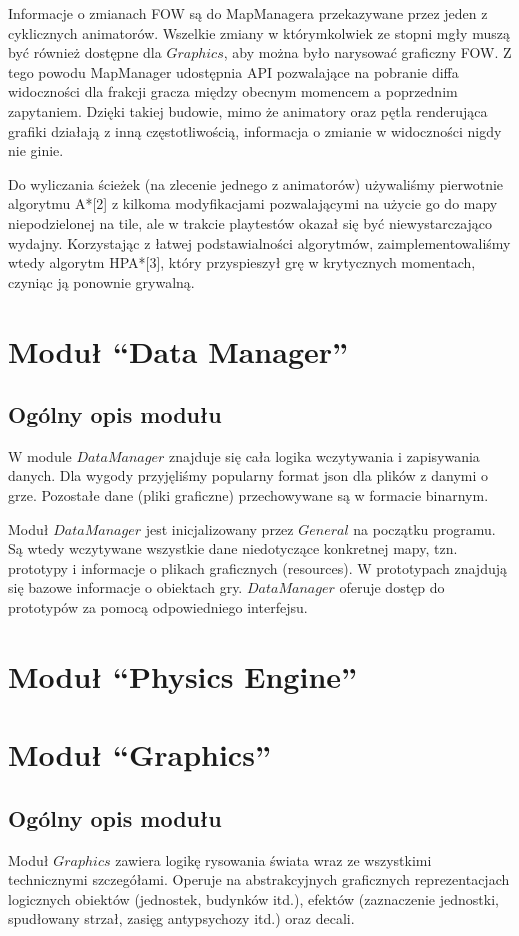 \documentclass[licencjacka]{pracamgr}
\begin{document}
    Informacje o zmianach FOW są do MapManagera przekazywane przez jeden z cyklicznych animatorów. Wszelkie zmiany
    w którymkolwiek ze stopni mgły muszą być również dostępne dla $Graphics$, aby można było narysować graficzny FOW. Z
    tego powodu MapManager udostępnia API pozwalające na pobranie diffa widoczności dla frakcji gracza między obecnym
    momencem a poprzednim zapytaniem. Dzięki takiej budowie, mimo że animatory oraz pętla renderująca grafiki działają
    z inną częstotliwością, informacja o zmianie w widoczności nigdy nie ginie.

    Do wyliczania ścieżek (na zlecenie jednego z animatorów) używaliśmy pierwotnie algorytmu A*[2] z kilkoma
    modyfikacjami pozwalającymi na użycie go do mapy niepodzielonej na tile, ale w trakcie playtestów okazał się być
    niewystarczająco wydajny. Korzystając z łatwej podstawialności algorytmów, zaimplementowaliśmy wtedy algorytm
    HPA*[3], który przyspieszył grę w krytycznych momentach, czyniąc ją ponownie grywalną.

  \section{Moduł ``Data Manager''}
    \subsection{Ogólny opis modułu}
      W module $DataManager$ znajduje się cała logika wczytywania i zapisywania danych. Dla wygody przyjęliśmy
      popularny format json dla plików z danymi o grze. Pozostałe dane (pliki graficzne) przechowywane są w formacie
      binarnym.

      Moduł $DataManager$ jest inicjalizowany przez $General$ na początku programu. Są wtedy wczytywane wszystkie dane
      niedotyczące konkretnej mapy, tzn. prototypy i informacje o plikach graficznych (resources). W prototypach
      znajdują się bazowe informacje o obiektach gry. $DataManager$ oferuje dostęp do prototypów za pomocą
      odpowiedniego interfejsu.

  \section{Moduł ``Physics Engine''}
  \section{Moduł ``Graphics''}
    \subsection{Ogólny opis modułu}
      Moduł $Graphics$ zawiera logikę rysowania świata wraz ze wszystkimi technicznymi szczegółami. Operuje na
      abstrakcyjnych graficznych reprezentacjach logicznych obiektów (jednostek, budynków itd.), efektów (zaznaczenie
      jednostki, spudłowany strzał, zasięg antypsychozy itd.) oraz decali.
\end{document}

